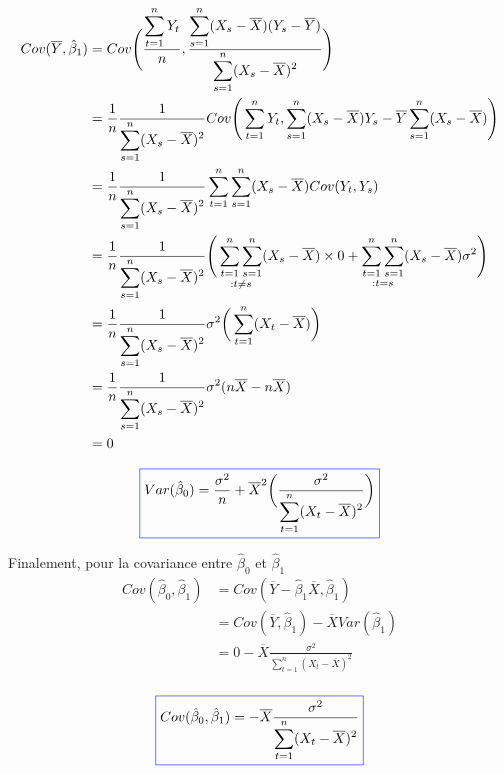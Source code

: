 \documentclass[11pt,french]{report}
\begin{document}
\begin{align*}
Cov(\overline{Y}, \hat{\beta}_1) &= Cov \Bigg( \frac{\displaystyle\sum_{t=1}^n Y_t}{n}, \frac{\displaystyle\sum_{s=1}^n(X_s- \overline{X})(Y_s - \overline{Y})}{\displaystyle\displaystyle\sum_{s=1}^n(X_s - \overline{X})^2} \Bigg) \\
&= \frac{1}{n}\frac{1}{\displaystyle\sum_{s=1}^n(X_s - \overline{X})^2} Cov\Bigg(\displaystyle\sum_{t=1}^n Y_t, \displaystyle\sum_{s=1}^n(X_s- \overline{X})Y_s - \overline{Y}\displaystyle\sum_{s=1}^n(X_s- \overline{X}) \Bigg) \\
&= \frac{1}{n}\frac{1}{\displaystyle\displaystyle\sum_{s=1}^n(X_s - \overline{X})^2} \displaystyle\sum_{t=1}^n \displaystyle\sum_{s=1}^n (X_s- \overline{X}) Cov(Y_t, Y_s) \\
&= \frac{1}{n}\frac{1}{\displaystyle\sum_{s=1}^n(X_s - \overline{X})^2} \Bigg( \mathop{\displaystyle\sum_{t=1}^n \displaystyle\sum_{s=1}^n}_{:t \neq s} (X_s- \overline{X}) \times 0 + \mathop{\displaystyle\sum_{t=1}^n \displaystyle\sum_{s=1}^n}_{:t = s} (X_s- \overline{X}) \sigma^2 \Bigg) \\
&= \frac{1}{n}\frac{1}{\displaystyle\sum_{s=1}^n(X_s - \overline{X})^2}\sigma^2 \bigg( \displaystyle\sum_{t=1}^n (X_t - \overline{X}) \bigg) \\
&= \frac{1}{n}\frac{1}{\displaystyle\sum_{s=1}^n(X_s - \overline{X})^2}\sigma^2 (n\overline{X}- n\overline{X}) \\
&= 0
\end{align*}

\begin{equation}
\label{eq:varbeta0}
\color{blue}
\boxed{\color{black}
Var(\hat{\beta}_0) = \frac{\sigma^2}{n}  + \overline{X}^2 \bigg(\frac{\sigma^2}{\displaystyle\sum_{t=1}^n (X_t - \overline{X})^2}\bigg)}
\end{equation}

Finalement, pour la covariance entre $\hat{\beta}_0$ et $\hat{\beta}_1$
\begin{align*}
Cov(\hat{\beta}_0, \hat{\beta}_1) &= Cov(\overline{Y} - \hat{\beta}_1\overline{X}, \hat{\beta}_1) \\
&= Cov(\overline{Y},  \hat{\beta}_1) - \overline{X} Var(\hat{\beta}_1) \\
&= 0 - \overline{X} \frac{\sigma^2}{\displaystyle\sum_{t=1}^n (X_t - \overline{X})^2} \\
\end{align*}

\begin{equation}
\label{eq:covariance}
\color{blue}
\boxed{\color{black}
Cov(\hat{\beta}_0, \hat{\beta}_1) = - \overline{X} \frac{\sigma^2}{\displaystyle\sum_{t=1}^n (X_t - \overline{X})^2}}
\end{equation}
\end{document}
